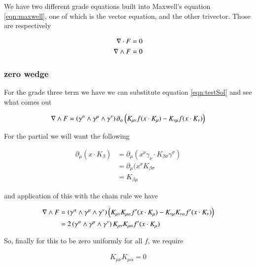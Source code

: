 \documentclass{article}
\begin{document}
We have two different grade equations built into Maxwell's equation \ref{eqn:maxwell}, one of which is the vector equation, and the other
trivector.  Those are respectively

\begin{align*}
\nabla \cdot F &= 0 \\
\nabla \wedge F &= 0
\end{align*}

\subsubsection{ zero wedge }

For the grade three term we have we can substitute equation \ref{eqn:testSol} and see what comes out

\begin{align*}
\nabla \wedge F 
&= 
\left( \gamma^\alpha \wedge \gamma^\mu \wedge \gamma^\nu\right)
\partial_\alpha \left( K_{\mu\nu} f( x \cdot K_\mu ) -K_{\nu\mu} f( x \cdot K_\nu ) \right) \\
\end{align*}

For the partial we will want the following

\begin{align*}
\partial_\mu ( x \cdot K_\beta ) 
&= \partial_\mu ( x^\nu \gamma_\nu \cdot K_{\beta\sigma} \gamma^\sigma ) \\
&= \partial_\mu ( x^\sigma K_{\beta\sigma} \\
&= K_{\beta\mu}
\end{align*}

and application of this with the chain rule we have

\begin{align*}
\nabla \wedge F 
&= 
\left( \gamma^\alpha \wedge \gamma^\mu \wedge \gamma^\nu\right)
\left( K_{\mu\nu} K_{\mu\alpha} f'( x \cdot K_\mu ) -K_{\nu\mu} K_{\nu\alpha} f'( x \cdot K_\nu ) \right) \\
&= 
2\left( \gamma^\alpha \wedge \gamma^\mu \wedge \gamma^\nu\right) K_{\mu\nu} K_{\mu\alpha} f'( x \cdot K_\mu ) 
\\
\end{align*}

So, finally for this to be zero uniformly for all $f$, we require

\begin{align*}
K_{\mu\nu} K_{\mu\alpha} = 0 
\end{align*}
\end{document}
